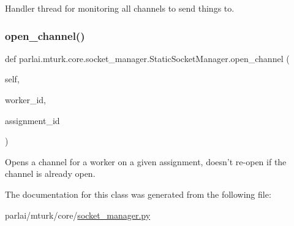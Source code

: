 \begin{DoxyVerb}Handler thread for monitoring all channels to send things to.
\end{DoxyVerb}
 \mbox{\label{classparlai_1_1mturk_1_1core_1_1socket__manager_1_1StaticSocketManager_a4672bc8a07f4ae122338ceb3a59cd54a}} 
\subsubsection{\texorpdfstring{open\+\_\+channel()}{open\_channel()}}
{\footnotesize\ttfamily def parlai.\+mturk.\+core.\+socket\+\_\+manager.\+Static\+Socket\+Manager.\+open\+\_\+channel (\begin{DoxyParamCaption}\item[{}]{self,  }\item[{}]{worker\+\_\+id,  }\item[{}]{assignment\+\_\+id }\end{DoxyParamCaption})}

\begin{DoxyVerb}Opens a channel for a worker on a given assignment, doesn't re-open if the
channel is already open.
\end{DoxyVerb}
 

The documentation for this class was generated from the following file\+:\begin{DoxyCompactItemize}
\item 
parlai/mturk/core/\hyperlink{socket__manager_8py}{socket\+\_\+manager.\+py}\end{DoxyCompactItemize}
